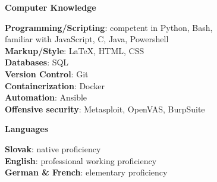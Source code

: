 \documentclass[12pt]{article}
\begin{document}

\vspace{0.2in} %

\begin{center}
	{\noindent \bfseries Computer Knowledge}
\end{center}

\vspace{0.1pt}

\noindent
{\bfseries Programming/Scripting}: competent in Python, Bash, \\[0.02in]
familiar with JavaScript, C, Java, Powershell \\[0.04in]
{\bfseries Markup/Style}: \LaTeX, HTML, CSS \\[0.04in]
{\bfseries Databases}: SQL \\[0.04in]
{\bfseries Version Control}: Git \\[0.04in]
{\bfseries Containerization}: Docker  \\[0.04in]
{\bfseries Automation}: Ansible \\[0.04in]
{\bfseries Offensive security}: Metasploit, OpenVAS, BurpSuite \\[0.04in]

\vspace{0.2in} %


\begin{center}
	{\noindent \bfseries Languages}
\end{center} 

\vspace{0.1pt}

\noindent
{\bfseries Slovak}: native proficiency \\[0.04in]
{\bfseries English}: professional working proficiency \\[0.04in]
{\bfseries German \& French}: elementary proficiency \\[0.04in]
\end{document}
